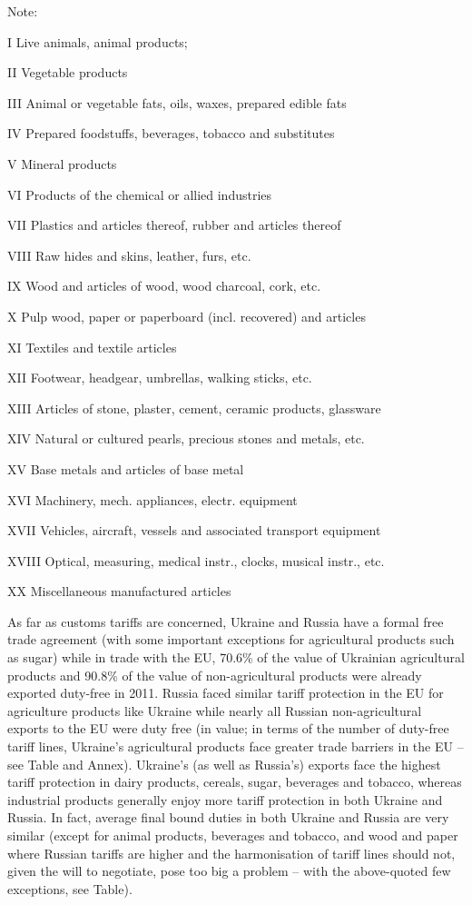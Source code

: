 {\small Note: 

I  Live animals, animal products; 

II  Vegetable products

III  Animal or vegetable fats, oils, waxes, prepared edible fats

IV  Prepared foodstuffs, beverages, tobacco and substitutes

V  Mineral products

VI  Products of the chemical or allied industries

VII  Plastics and articles thereof, rubber and articles thereof

VIII  Raw hides and skins, leather, furs, etc.

IX  Wood and articles of wood, wood charcoal, cork, etc.

X  Pulp wood, paper or paperboard (incl. recovered) and articles

XI  Textiles and textile articles

XII  Footwear, headgear, umbrellas, walking sticks, etc.

XIII  Articles of stone, plaster, cement, ceramic products, glassware

XIV  Natural or cultured pearls, precious stones and metals, etc.

XV  Base metals and articles of base metal

XVI  Machinery, mech. appliances, electr. equipment

XVII  Vehicles, aircraft, vessels and associated transport equipment

XVIII  Optical, measuring, medical instr., clocks, musical instr., etc.

XX  Miscellaneous manufactured articles}


As far as customs tariffs are concerned, Ukraine and Russia have a formal free trade agreement (with some important exceptions for agricultural products such as sugar) while in trade with the EU, 70.6\% of the value of Ukrainian agricultural products and 90.8\% of the value of non-agricultural products were already exported duty-free in 2011. Russia faced similar tariff protection in the EU for agriculture products like Ukraine while nearly all Russian non-agricultural exports to the EU were duty free (in value; in terms of the number of duty-free tariff lines, Ukraine's agricultural products face greater trade barriers in the EU -- see Table and Annex). Ukraine's (as well as Russia's) exports face the highest tariff protection in dairy products, cereals, sugar, beverages and tobacco, whereas industrial products generally enjoy more tariff protection in both Ukraine and Russia. In fact, average final bound duties in both Ukraine and Russia are very similar (except for animal products, beverages and tobacco, and wood and paper where Russian tariffs are higher and the harmonisation of tariff lines should not, given the will to negotiate, pose too big a problem -- with the above-quoted few exceptions, see Table).

